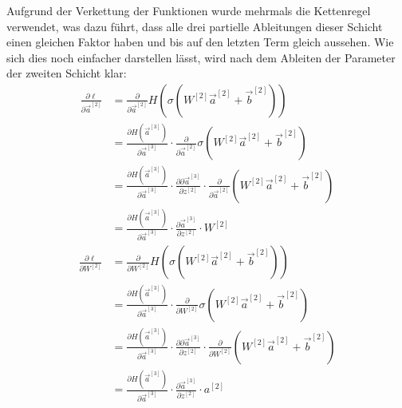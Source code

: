 \documentclass[12pt,titlepage]{article}
\begin{document}
Aufgrund der Verkettung der Funktionen wurde mehrmals die Kettenregel verwendet, was dazu führt, dass alle drei partielle Ableitungen dieser Schicht einen gleichen Faktor haben und bis auf den letzten Term gleich aussehen. Wie sich dies noch einfacher darstellen lässt, wird nach dem Ableiten der Parameter der zweiten Schicht klar:
\begin{align*}
  \frac{\partial \ell}{\partial \vec{a}^{[2]}}
   & = \frac{\partial}{\partial \vec{a}^{[2]}} H(\sigma(W^{[2]} \vec{a}^{[2]} + \vec{b}^{[2]}))                                                                                                                      \\
   & = \frac{\partial H(\vec{a}^{[3]})}{\partial \vec{a}^{[3]}} \cdot \frac{\partial}{\partial \vec{a}^{[2]}} \sigma(W^{[2]} \vec{a}^{[2]} + \vec{b}^{[2]})                                                          \\
   & = \frac{\partial H(\vec{a}^{[3]})}{\partial \vec{a}^{[3]}} \cdot \frac{\partial \partial \vec{a}^{[3]}}{\partial z^{[2]}} \cdot \frac{\partial}{\partial \vec{a}^{[2]}} (W^{[2]} \vec{a}^{[2]} + \vec{b}^{[2]}) \\
   & = \frac{\partial H(\vec{a}^{[3]})}{\partial \vec{a}^{[3]}} \cdot \frac{\partial \vec{a}^{[3]}}{\partial z^{[2]}} \cdot W^{[2]}
\end{align*}
\begin{align*}
  \frac{\partial \ell}{\partial W^{[2]}}
   & = \frac{\partial}{\partial W^{[2]}} H(\sigma(W^{[2]} \vec{a}^{[2]} + \vec{b}^{[2]}))                                                                                                                      \\
   & = \frac{\partial H(\vec{a}^{[3]})}{\partial \vec{a}^{[3]}} \cdot \frac{\partial}{\partial W^{[2]}} \sigma(W^{[2]} \vec{a}^{[2]} + \vec{b}^{[2]})                                                          \\
   & = \frac{\partial H(\vec{a}^{[3]})}{\partial \vec{a}^{[3]}} \cdot \frac{\partial \partial \vec{a}^{[3]}}{\partial z^{[2]}} \cdot \frac{\partial}{\partial W^{[2]}} (W^{[2]} \vec{a}^{[2]} + \vec{b}^{[2]}) \\
   & = \frac{\partial H(\vec{a}^{[3]})}{\partial \vec{a}^{[3]}} \cdot \frac{\partial \vec{a}^{[3]}}{\partial z^{[2]}} \cdot a^{[2]}
\end{align*}
\end{document}
